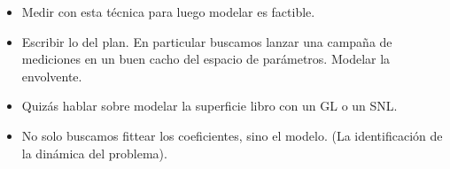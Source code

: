 \documentclass[../main.tex]{subfiles}
\begin{document}
\begin{itemize}
	\item Medir con esta técnica para luego modelar es factible.
	\item Escribir lo del plan. En particular buscamos lanzar una campaña de mediciones en un buen cacho del espacio de parámetros. Modelar la envolvente.
	\item Quizás hablar sobre modelar la superficie libro con un GL o un SNL.
	\item No solo buscamos fittear los coeficientes, sino el modelo. (La identificación de la dinámica del problema).
\end{itemize}
\end{document}
